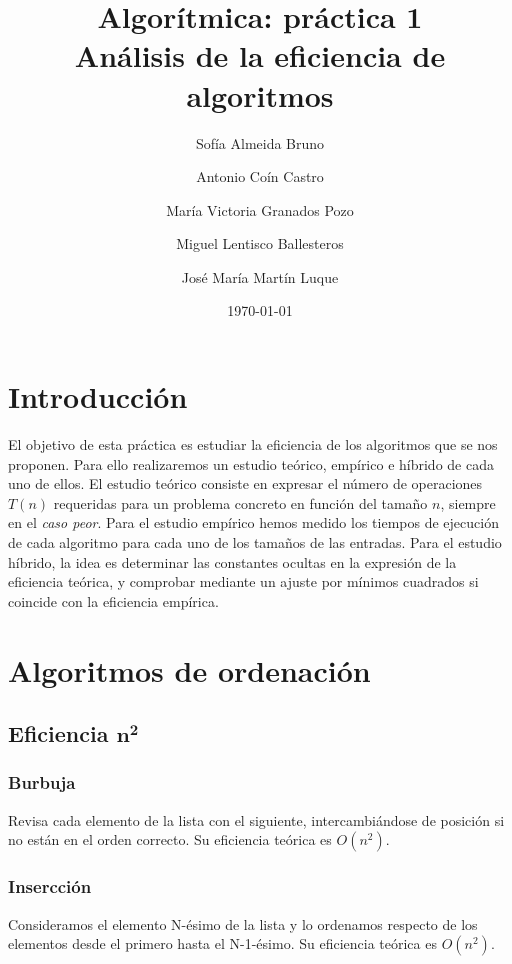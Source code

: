 \documentclass[11pt]{article}
\title{Algorítmica: práctica 1 \\ \large Análisis de la eficiencia de algoritmos}
\author{Sofía Almeida Bruno \and Antonio Coín Castro \and María Victoria Granados Pozo \and Miguel Lentisco Ballesteros \and José María Martín Luque}
\date{\today}
\begin{document}
\maketitle

\newpage

\section*{Introducción}
El objetivo de esta práctica es estudiar la eficiencia de los algoritmos que se nos proponen. Para ello realizaremos un estudio teórico, empírico e híbrido de cada uno de ellos. 
El estudio teórico consiste en expresar el número de operaciones $T(n)$ requeridas para un problema concreto en función del tamaño $n$, siempre en el \textit{caso peor}. Para el estudio empírico hemos medido los tiempos de ejecución de cada algoritmo para cada uno de los tamaños de las entradas. Para el estudio híbrido, la idea es determinar las constantes ocultas en la expresión de la eficiencia teórica, y comprobar mediante un ajuste por mínimos cuadrados si coincide con la eficiencia empírica.

\section*{Algoritmos de ordenación}
\subsection*{Eficiencia $\boldsymbol{n^2}$}
\subsubsection*{Burbuja}
Revisa cada elemento de la lista con el siguiente, intercambiándose de posición si no están en el orden correcto. Su eficiencia teórica es $O(n^2)$.
\begin{center}
	
\end{center}

\subsubsection*{Insercción}
Consideramos el elemento N-ésimo de la lista y lo ordenamos respecto de los elementos desde el primero hasta el N-1-ésimo. Su eficiencia teórica es $O(n^2)$.
\begin{center}
	
\end{center}
\end{document}
